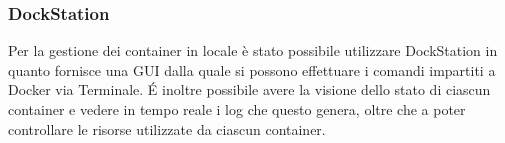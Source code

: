         \subsubsection{DockStation}
        Per la gestione dei container in locale è stato possibile utilizzare DockStation in quanto fornisce una GUI dalla quale si possono effettuare i comandi impartiti a Docker via Terminale.
        \'E inoltre possibile avere la visione dello stato di ciascun container e vedere in tempo reale i log che questo genera, oltre che a poter controllare le risorse utilizzate da ciascun container.
        
			